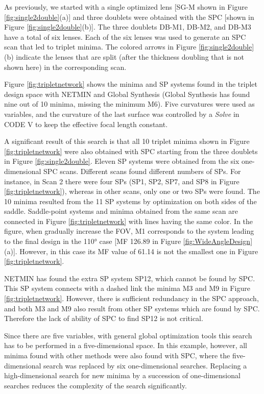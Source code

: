 As previously, we started with a single optimized lens [SG-M shown in Figure \ref{fig:single2double}(a)] and three doublets were obtained with the SPC [shown in Figure \ref{fig:single2double}(b)]. The three doublets DB-M1, DB-M2, and DB-M3 have a total of six lenses.  Each of the six lenses was used to generate an SPC scan that led to triplet minima. The colored arrows in Figure \ref{fig:single2double}(b) indicate the lenses that are split (after the thickness doubling that is not shown here) in the corresponding scan.

Figure \ref{fig:tripletnetwork} shows the minima and SP systems found in the triplet design space with NETMIN and Global Synthesis (Global Synthesis has found nine out of 10 minima, missing the minimum M6). Five curvatures were used as variables, and the curvature of the last surface was controlled by a \textit{Solve} in CODE V to keep the effective focal length constant.

A significant result of this search is that all 10 triplet minima shown in Figure \ref{fig:tripletnetwork} were also obtained with SPC starting from the three doublets in Figure \ref{fig:single2double}. Eleven SP systems were obtained from the six one-dimensional SPC scans. Different scans found different numbers of SPs. For instance, in Scan 2 there were four SPs (SP1, SP2, SP7, and SP8 in Figure \ref{fig:tripletnetwork}), whereas in other scans, only one or two SPs were found. The 10 minima resulted from the 11 SP systems by optimization on both sides of the saddle. Saddle-point systems and minima obtained from the same scan are connected in Figure \ref{fig:tripletnetwork} with lines having the same color. In the figure, when gradually increase the FOV, M1 corresponds to the system leading to the final design in the 110° case [MF 126.89 in Figure \ref{fig:WideAngleDesign}(a)]. However, in this case its MF value of 61.14 is not the smallest one in Figure \ref{fig:tripletnetwork}.

NETMIN has found the extra SP system SP12, which cannot be found by SPC. This SP system connects with a dashed link the minima M3 and M9 in Figure \ref{fig:tripletnetwork}. However, there is sufficient redundancy in the SPC approach, and both M3 and M9 also result from other SP systems which are found by SPC. Therefore the lack of ability of SPC to find SP12 is not critical.

Since there are five variables, with general global optimization tools this search has to be performed in a five-dimensional space. In this example, however, all minima found with other methods were also found with SPC, where the five-dimensional search was replaced by six one-dimensional searches. Replacing a high-dimensional search for new minima by a succession of one-dimensional searches reduces the complexity of the search significantly.

